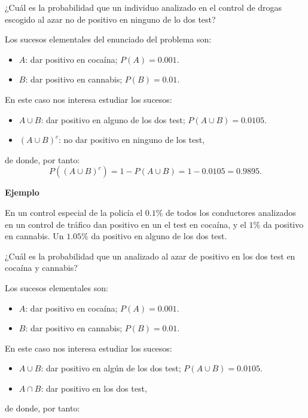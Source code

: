 \documentclass[]{book}
\providecommand{\tightlist}{%
  \setlength{\itemsep}{0pt}\setlength{\parskip}{0pt}}
\begin{document}
¿Cuál es la probabilidad que un individuo analizado en el control de drogas escogido al azar no de positivo en ninguno de lo dos test?

Los sucesos elementales del enunciado del problema son:

\begin{itemize}
\tightlist
\item
  \(A\): dar positivo en cocaína; \(P(A)=0.001\).
\item
  \(B\): dar positivo en cannabis; \(P(B)=0.01\).
\end{itemize}

En este caso nos interesa estudiar los sucesos:

\begin{itemize}
\tightlist
\item
  \(A\cup B\): dar positivo en alguno de los dos test; \(P(A\cup B)=0.0105\).
\item
  \((A\cup B)^c\): no dar positivo en ninguno de los test,
\end{itemize}

de donde, por tanto:
\[P((A\cup B)^c)=1-P(A\cup B)=1-0.0105=0.9895.\]

\textbf{Ejemplo}

En un control especial de la policía el \(0.1\%\) de todos los conductores analizados en un control de tráfico dan positivo en un el test en cocaína, y el \(1\%\) da positivo en cannabis. Un \(1.05\%\) da positivo en alguno de los dos test.

¿Cuál es la probabilidad que un analizado al azar de positivo en los dos test en cocaína y cannabis?

Los sucesos elementales son:

\begin{itemize}
\tightlist
\item
  \(A\): dar positivo en cocaína; \(P(A)=0.001\).
\item
  \(B\): dar positivo en cannabis; \(P(B)=0.01\).
\end{itemize}

En este caso nos interesa estudiar los sucesos:

\begin{itemize}
\tightlist
\item
  \(A\cup B\): dar positivo en algún de los dos test; \(P(A\cup B)=0.0105\).
\item
  \(A\cap B\): dar positivo en los dos test,
\end{itemize}

de donde, por tanto:
\end{document}
